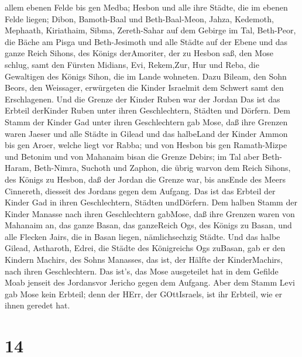 allem ebenen Felde bis gen Medba;  Hesbon und alle ihre
Städte, die im ebenen Felde liegen; Dibon, Bamoth-Baal und
Beth-Baal-Meon,  Jahza, Kedemoth, Mephaath, 
Kiriathaim, Sibma, Zereth-Sahar auf dem Gebirge im Tal, 
Beth-Peor, die Bäche am Pisga und Beth-Jesimoth  und alle
Städte auf der Ebene und das ganze Reich Sihons, des Königs derAmoriter,
der zu Hesbon saß, den Mose schlug, samt den Fürsten Midians, Evi,
Rekem,Zur, Hur und Reba, die Gewaltigen des Königs Sihon, die im Lande
wohneten.  Dazu Bileam, den Sohn Beors, den Weissager,
erwürgeten die Kinder Israelmit dem Schwert samt den Erschlagenen.
 Und die Grenze der Kinder Ruben war der Jordan Das ist das
Erbteil derKinder Ruben unter ihren Geschlechtern, Städten und Dörfern.
 Dem Stamm der Kinder Gad unter ihren Geschlechtern gab
Mose,  daß ihre Grenzen waren Jaeser und alle Städte in
Gilead und das halbeLand der Kinder Ammon bis gen Aroer, welche liegt
vor Rabba;  und von Hesbon bis gen Ramath-Mizpe und Betonim
und von Mahanaim bisan die Grenze Debirs;  im Tal aber
Beth-Haram, Beth-Nimra, Suchoth und Zaphon, die übrig warvon dem Reich
Sihons, des Königs zu Hesbon, daß der Jordan die Grenze war, bis ansEnde
des Meers Cinnereth, diesseit des Jordans gegen dem Aufgang.
 Das ist das Erbteil der Kinder Gad in ihren Geschlechtern,
Städten undDörfern.  Dem halben Stamm der Kinder Manasse
nach ihren Geschlechtern gabMose,  daß ihre Grenzen waren
von Mahanaim an, das ganze Basan, das ganzeReich Ogs, des Königs zu
Basan, und alle Flecken Jairs, die in Basan liegen, nämlichsechzig
Städte.  Und das halbe Gilead, Astharoth, Edrei, die Städte
des Königreichs Ogs zuBasan, gab er den Kindern Machirs, des Sohns
Manasses, das ist, der Hälfte der KinderMachirs, nach ihren
Geschlechtern.  Das ist's, das Mose ausgeteilet hat in dem
Gefilde Moab jenseit des Jordansvor Jericho gegen dem Aufgang.
 Aber dem Stamm Levi gab Mose kein Erbteil; denn der HErr,
der GOttIsraels, ist ihr Erbteil, wie er ihnen geredet hat.

\hypertarget{section-13}{%
\section{14}\label{section-13}}

